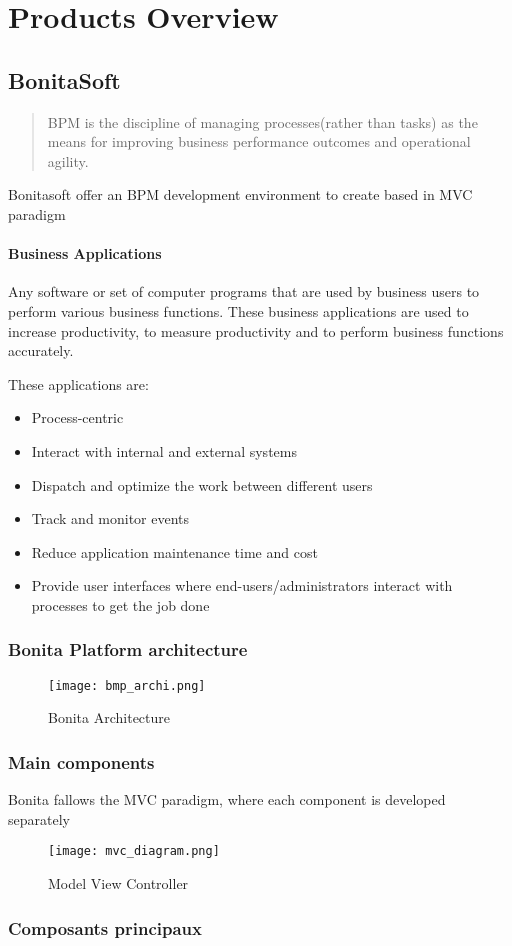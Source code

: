 \section{Products Overview}
\subsection{BonitaSoft}
\begin{quotation}
BPM is the discipline of managing processes(rather than tasks) as the means for improving business performance outcomes and operational agility. \cite{Gheorghe2014IntegratingSystems}
\end{quotation}

Bonitasoft offer an BPM development environment to create  based in MVC paradigm

\paragraph{Business Applications} \label{businessApp}
Any software or set of computer programs that are used by business users to perform various business functions. These business applications are used to increase productivity, to measure productivity and to perform business functions accurately.\cite{BusinessSoftware}

These applications are:
\begin{itemize}
\item Process-centric
\item Interact with internal and external systems
\item Dispatch and optimize the work between different users
\item Track and monitor events
\item Reduce application maintenance time and cost
\item Provide user interfaces where end-users/administrators interact with processes to get the job done
\end{itemize}

\subsubsection{Bonita Platform architecture}
\begin{figure}[!ht]
\texttt{[image: bmp\_archi.png]}
\caption{Bonita Architecture}
\end{figure}

\subsubsection{Main components}
Bonita fallows the MVC paradigm, where each component is developed separately

\begin{figure}[!ht]
\texttt{[image: mvc\_diagram.png]}
\caption{Model View Controller}
\end{figure}


\subsubsection{Composants principaux}






